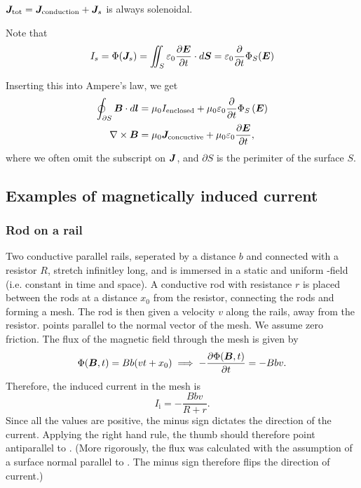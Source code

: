     $\bm{J}_{\text{tot}} = \bm{J}_{\text{conduction}} + \bm{J}_s$ is always solenoidal. 

    Note that 
    \begin{equation*}
        I_s = \Phi(\bm{J}_s) = \iint_S \varepsilon_0\frac{\partial\bm{E}}{\partial t}\cdot d\bm{S} = \varepsilon_0\frac{\partial}{\partial t}\Phi_S(\bm{E})
    \end{equation*}

    Inserting this into Ampere's law, we get 
    \begin{align}
        \oint_{\partial S}\bm{B}\cdot d\bm{l} &= \mu_0 I_{\text{enclosed}} + \mu_0\varepsilon_0\frac{\partial}{\partial t}\Phi_S\left(\bm{E}\right)\\
        \nabla\times\bm{B} &= \mu_0\bm{J}_{\text{concuctive}} + \mu_0\varepsilon_0\frac{\partial\bm{E}}{\partial t},
    \end{align}
    where we often omit the subscript on $\bm{J}$, and $\partial S$ is the perimiter of the surface $S$.

\subsection{Examples of magnetically induced current}
    \subsubsection*{Rod on a rail}
        Two conductive parallel rails, seperated by a distance $b$ and connected with a resistor $R$, stretch infinitley long, 
        and is immersed in a static and uniform \B-field (i.e. constant in time and space). 
        A conductive rod with resistance $r$ is placed between the rods at a distance $x_0$ from the resistor, 
        connecting the rods and forming a mesh. The rod is then given a velocity $v$ along the rails, away from the resistor.
        \B{} points parallel to the normal vector of the mesh. We assume zero friction. 
        The flux of the magnetic field through the mesh is given by
        \begin{equation}
            \Phi(\bm{B}, t) = Bb(vt+x_0) \implies -\frac{\partial \Phi(\bm{B}, t)}{\partial t} = -Bbv.
        \end{equation}
        Therefore, the induced current in the mesh is
        \begin{equation}
            I_\text{i} = -\frac{Bbv}{R+r}.
        \end{equation}
        Since all the values are positive, the minus sign dictates the direction of the current. Applying the right hand rule,
        the thumb should therefore point antiparallel to \B. 
        (More rigorously, the flux was calculated with the assumption of a surface normal parallel to \B. 
        The minus sign therefore flips the direction of current.)

